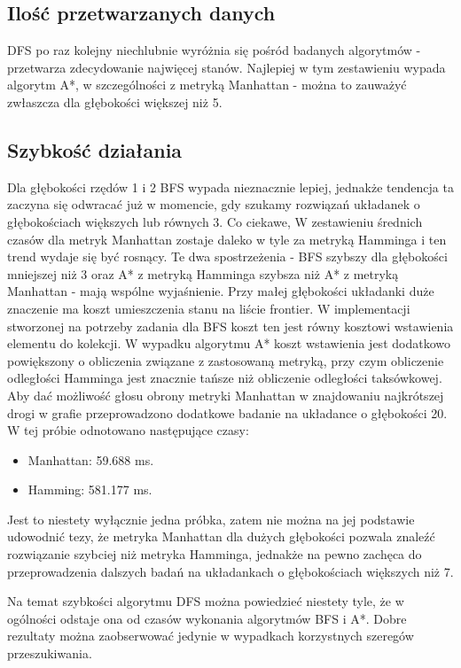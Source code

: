\documentclass{classrep}
\begin{document}
\subsection{Ilość przetwarzanych danych}

DFS po raz kolejny niechlubnie wyróżnia się pośród badanych algorytmów - przetwarza zdecydowanie najwięcej stanów.
Najlepiej w tym zestawieniu wypada algorytm A*, w szczególności z metryką Manhattan - można to zauważyć
zwłaszcza dla głębokości większej niż 5.

\subsection{Szybkość działania}

Dla głębokości rzędów 1 i 2 BFS wypada nieznacznie lepiej, jednakże tendencja ta zaczyna się odwracać już w
momencie, gdy szukamy rozwiązań układanek o głębokościach większych lub równych 3. Co ciekawe, W zestawieniu
średnich czasów dla metryk Manhattan zostaje daleko w tyle za metryką Hamminga i ten trend wydaje się być
rosnący. Te dwa spostrzeżenia - BFS szybszy dla głębokości mniejszej niż 3 oraz A* z metryką Hamminga szybsza
niż A* z metryką Manhattan - mają wspólne wyjaśnienie. Przy małej głębokości układanki duże znaczenie ma koszt
umieszczenia stanu na liście frontier. W implementacji stworzonej na potrzeby zadania  dla BFS koszt
ten jest równy kosztowi wstawienia elementu do kolekcji. W wypadku algorytmu A* koszt wstawienia jest
dodatkowo powiększony o obliczenia związane z zastosowaną metryką, przy czym obliczenie odległości Hamminga
jest znacznie tańsze niż obliczenie odległości taksówkowej. Aby dać możliwość głosu obrony metryki Manhattan w
znajdowaniu najkrótszej drogi w grafie przeprowadzono dodatkowe badanie na układance o głębokości 20. W tej
próbie odnotowano następujące czasy:

\begin{itemize}
  \item Manhattan: 59.688 ms.
  \item Hamming: 581.177 ms.
\end{itemize}

Jest to niestety wyłącznie jedna próbka, zatem nie można na jej podstawie udowodnić tezy, że metryka Manhattan
dla dużych głębokości pozwala znaleźć rozwiązanie szybciej niż metryka Hamminga, jednakże na pewno zachęca do
przeprowadzenia dalszych badań na układankach o głębokościach większych niż 7.

Na temat szybkości algorytmu DFS można powiedzieć niestety tyle, że w ogólności odstaje ona od czasów
wykonania algorytmów BFS i A*. Dobre rezultaty można zaobserwować jedynie w wypadkach korzystnych szeregów
przeszukiwania.
\end{document}
